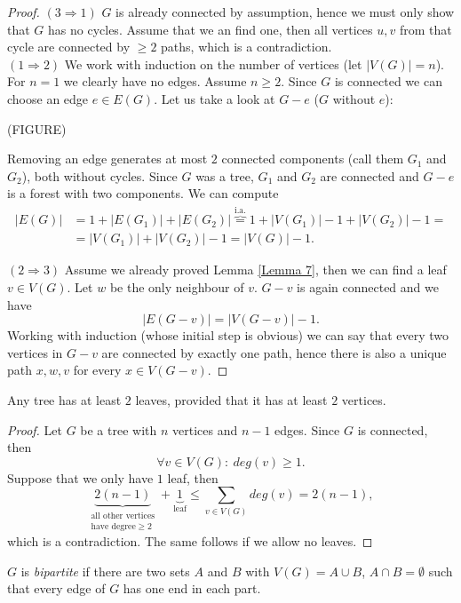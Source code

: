 \begin{proof}
\emph{$(3\Rightarrow 1)$} $G$ is already connected by assumption, hence we must only show that $G$ has no cycles. Assume that we an find one, then all vertices $u,v$ from that cycle are connected by $\geqslant 2$ paths, which is a contradiction.
\\ \emph{$(1\Rightarrow 2)$} We work with induction on the number of vertices (let $|V(G)|=n$). For $n=1$ we clearly have no edges. Assume $n\geqslant 2$. Since $G$ is connected we can choose an edge $e\in E(G)$. Let us take a look at $G-e$ ($G$ without $e$):

(FIGURE)


Removing an edge generates at most $2$ connected components (call them $G_1$ and $G_2$), both without cycles. Since $G$ was a tree, $G_1$ and $G_2$ are connected and $G-e$ is a forest with two components. We can compute
\begin{align*}
|E(G)|&=1+|E(G_1)|+|E(G_2)|\overbrace{=}^{\text{i.a.}}1+|V(G_1)|-1+|V(G_2)|-1=\\
&=|V(G_1)|+|V(G_2)|-1 = |V(G)|-1.
\end{align*}

\emph{$(2\Rightarrow 3)$} Assume we already proved Lemma \ref{Lemma 7}, then we can find a leaf $v\in V(G)$. Let $w$ be the only neighbour of $v$. $G-v$ is again connected and we have
$$|E(G-v)|=|V(G-v)|-1.$$
Working with induction (whose initial step is obvious) we can say that every two vertices in $G-v$ are connected by exactly one path, hence there is also a unique path $x,w,v$ for every $x\in V(G-v)$.
\end{proof}

\begin{lemma} \label{Lemma 7}
Any tree has at least $2$ leaves, provided that it has at least $2$ vertices.
\end{lemma}

\begin{proof}
Let $G$ be a tree with $n$ vertices and $n-1$ edges. Since $G$ is connected, then 
$$\forall v\in V(G): \ deg(v)\geqslant 1.$$
Suppose that we only have $1$ leaf, then
$$\underbrace{2(n-1)}_{\substack{\text{all other vertices}\\ \text{have degree} \geqslant 2}} +\underbrace{1}_{\text{leaf}} \leqslant \sum_{v\in V(G)}deg(v)=2(n-1),$$
which is a contradiction. The same follows if we allow no leaves.
\end{proof}


\begin{definition} $G$ is \emph{bipartite} if there are two sets $A$ and $B$ with $V(G)=A\cup B$, $A\cap B=\emptyset$ such that every edge of $G$ has one end in each part.
\end{definition}

